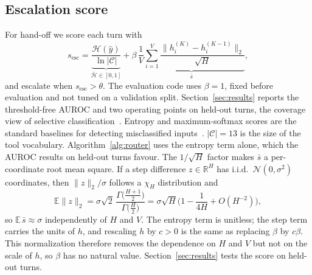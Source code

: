 \documentclass[10pt]{article}
\begin{document}
\subsection{Escalation score}\label{sec:escalation}
For hand-off we score each turn with
\begin{equation}\label{eq:escalate}
s_{\text{esc}} = \underbrace{\frac{\mathcal{H}(\hat y)}{\ln|\mathcal{C}|}}_{\bar{\mathcal H}\in[0,1]} + \beta\, \underbrace{\frac{1}{V}\sum_{i=1}^{V}\frac{\|h_i^{(K)}-h_i^{(K-1)}\|_2}{\sqrt{H}}}_{\bar s},
\end{equation}
and escalate when $s_{\text{esc}} > \theta$. The evaluation code uses $\beta{=}1$, fixed before evaluation and not tuned on a validation split. Section~\ref{sec:results} reports the threshold-free AUROC and two operating points on held-out turns, the coverage view of selective classification~\citep{chow1970optimum,geifman2017selective}. Entropy and maximum-softmax scores are the standard baselines for detecting misclassified inputs~\citep{hendrycks2017baseline}. $|\mathcal C|{=}13$ is the size of the tool vocabulary. Algorithm~\ref{alg:router} uses the entropy term alone, which the AUROC results on held-out turns favour. The $1/\sqrt{H}$ factor makes $\bar s$ a per-coordinate root mean square. If a step difference $z\in\mathbb{R}^H$ has i.i.d.\ $\mathcal{N}(0,\sigma^2)$ coordinates, then $\|z\|_2/\sigma$ follows a $\chi_H$ distribution and
\begin{equation}
\mathbb{E}\|z\|_2 = \sigma\sqrt{2}\,\frac{\Gamma\!\big(\tfrac{H+1}{2}\big)}{\Gamma\!\big(\tfrac{H}{2}\big)} = \sigma\sqrt{H}\Big(1 - \frac{1}{4H} + O(H^{-2})\Big),
\end{equation}
so $\mathbb{E}\,\bar s \approx \sigma$ independently of $H$ and $V$. The entropy term is unitless; the step term carries the units of $h$, and rescaling $h$ by $c>0$ is the same as replacing $\beta$ by $c\beta$. This normalization therefore removes the dependence on $H$ and $V$ but not on the scale of $h$, so $\beta$ has no natural value. Section~\ref{sec:results} tests the score on held-out turns.
\end{document}
